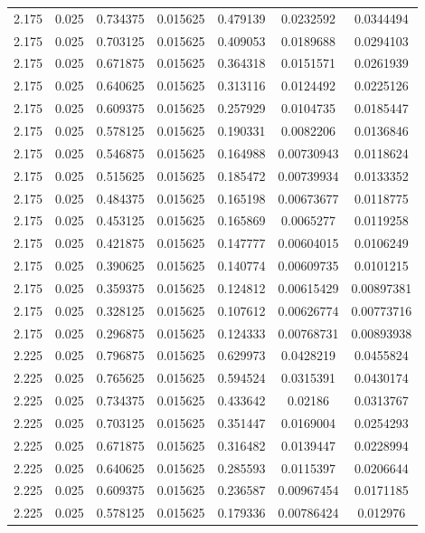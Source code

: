 \begin{flushleft}
\begin{longtable}{ccccccc}
2.175 & 0.025 & 0.734375 & 0.015625 & 0.479139 & 0.0232592 & 0.0344494  \\ 
2.175 & 0.025 & 0.703125 & 0.015625 & 0.409053 & 0.0189688 & 0.0294103  \\ 
2.175 & 0.025 & 0.671875 & 0.015625 & 0.364318 & 0.0151571 & 0.0261939  \\ 
2.175 & 0.025 & 0.640625 & 0.015625 & 0.313116 & 0.0124492 & 0.0225126  \\ 
2.175 & 0.025 & 0.609375 & 0.015625 & 0.257929 & 0.0104735 & 0.0185447  \\ 
2.175 & 0.025 & 0.578125 & 0.015625 & 0.190331 & 0.0082206 & 0.0136846  \\ 
2.175 & 0.025 & 0.546875 & 0.015625 & 0.164988 & 0.00730943 & 0.0118624  \\ 
2.175 & 0.025 & 0.515625 & 0.015625 & 0.185472 & 0.00739934 & 0.0133352  \\ 
2.175 & 0.025 & 0.484375 & 0.015625 & 0.165198 & 0.00673677 & 0.0118775  \\ 
2.175 & 0.025 & 0.453125 & 0.015625 & 0.165869 & 0.0065277 & 0.0119258  \\ 
2.175 & 0.025 & 0.421875 & 0.015625 & 0.147777 & 0.00604015 & 0.0106249  \\ 
2.175 & 0.025 & 0.390625 & 0.015625 & 0.140774 & 0.00609735 & 0.0101215  \\ 
2.175 & 0.025 & 0.359375 & 0.015625 & 0.124812 & 0.00615429 & 0.00897381  \\ 
2.175 & 0.025 & 0.328125 & 0.015625 & 0.107612 & 0.00626774 & 0.00773716  \\ 
2.175 & 0.025 & 0.296875 & 0.015625 & 0.124333 & 0.00768731 & 0.00893938  \\ 
2.225 & 0.025 & 0.796875 & 0.015625 & 0.629973 & 0.0428219 & 0.0455824  \\ 
2.225 & 0.025 & 0.765625 & 0.015625 & 0.594524 & 0.0315391 & 0.0430174  \\ 
2.225 & 0.025 & 0.734375 & 0.015625 & 0.433642 & 0.02186 & 0.0313767  \\ 
2.225 & 0.025 & 0.703125 & 0.015625 & 0.351447 & 0.0169004 & 0.0254293  \\ 
2.225 & 0.025 & 0.671875 & 0.015625 & 0.316482 & 0.0139447 & 0.0228994  \\ 
2.225 & 0.025 & 0.640625 & 0.015625 & 0.285593 & 0.0115397 & 0.0206644  \\ 
2.225 & 0.025 & 0.609375 & 0.015625 & 0.236587 & 0.00967454 & 0.0171185  \\ 
2.225 & 0.025 & 0.578125 & 0.015625 & 0.179336 & 0.00786424 & 0.012976  \\ 

\end{longtable}
\end{flushleft}

